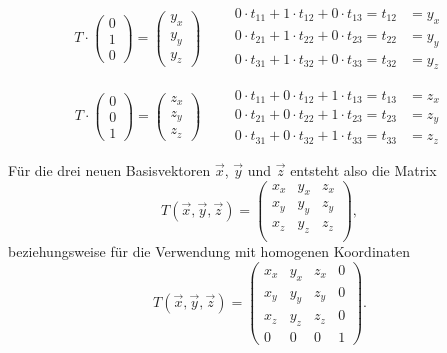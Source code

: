 \begin{equation}
 T \cdot \begin{pmatrix} 0 \\ 1 \\ 0 \end{pmatrix} = \begin{pmatrix} y_x \\ y_y \\ y_z \end{pmatrix} \qquad
\begin{aligned}
 0 \cdot t_{11} + 1 \cdot t_{12} + 0 \cdot t_{13} = t_{12} &= y_x \\
 0 \cdot t_{21} + 1 \cdot t_{22} + 0 \cdot t_{23} = t_{22} &= y_y \\
 0 \cdot t_{31} + 1 \cdot t_{32} + 0 \cdot t_{33} = t_{32} &= y_z
\end{aligned}
\end{equation}

\begin{equation}
 T \cdot \begin{pmatrix} 0 \\ 0 \\ 1 \end{pmatrix} = \begin{pmatrix} z_x \\ z_y \\ z_z \end{pmatrix} \qquad
\begin{aligned}
 0 \cdot t_{11} + 0 \cdot t_{12} + 1 \cdot t_{13} = t_{13} &= z_x \\
 0 \cdot t_{21} + 0 \cdot t_{22} + 1 \cdot t_{23} = t_{23} &= z_y \\
 0 \cdot t_{31} + 0 \cdot t_{32} + 1 \cdot t_{33} = t_{33} &= z_z
\end{aligned}
\end{equation}

Für die drei neuen Basisvektoren $\vec x$, $\vec y$ und $\vec z$ entsteht also die Matrix
\begin{equation}
 T(\vec x, \vec y, \vec z) =
 \begin{pmatrix}
  x_x & y_x & z_x \\
  x_y & y_y & z_y \\
  x_z & y_z & z_z \\
 \end{pmatrix},
\end{equation}
beziehungsweise für die Verwendung mit homogenen Koordinaten
\begin{equation}
 T(\vec x, \vec y, \vec z) =
 \begin{pmatrix}
  x_x & y_x & z_x & 0 \\
  x_y & y_y & z_y & 0 \\
  x_z & y_z & z_z & 0 \\
  0 & 0 & 0 & 1
 \end{pmatrix}.
\end{equation}

